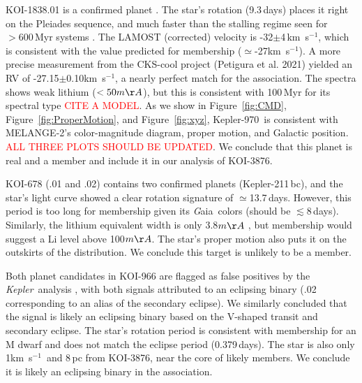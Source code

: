 \documentclass[twocolumn]{aastex631}
\newcommand{\starname}{KOI-3876}
\newcommand{\starnametwo}{Kepler-970}
\newcommand{\kepler}{{\it Kepler}}
\newcommand\kms{km~s$^{-1}$}
\newcommand{\gaia}{{\textit Gaia}}
\newcommand{\association}{MELANGE-2}
\begin{document}
KOI-1838.01 is a confirmed planet \citep[Kepler-970 b;][]{2016ApJ...822...86M}. The star's rotation (9.3\,days) places it right on the Pleiades sequence, and much faster than the stalling regime seen for $>600$\,Myr systems \citep{Curtis_stall}. The LAMOST (corrected) velocity is -32$\pm$4\,\kms, which is consistent with the value predicted for membership ($\simeq$-27\kms). A more precise measurement from the CKS-cool project (Petigura et al. 2021) yielded an RV of -27.15$\pm$0.10\kms, a nearly perfect match for the association. The spectra shows weak lithium ($<50m\AA$), but this is consistent with 100\,Myr for its spectral type \textcolor{red}{CITE A MODEL}. As we show in Figure~\ref{fig:CMD}, Figure~\ref{fig:ProperMotion}, and Figure~\ref{fig:xyz}, \starnametwo\ is consistent with \association's color-magnitude diagram, proper motion, and Galactic position. \textcolor{red}{ALL THREE PLOTS SHOULD BE UPDATED}. We conclude that this planet is real and a member and include it in our analysis of \starname.


KOI-678 (.01 and .02) contains two confirmed planets (Kepler-211\,bc), and the star's light curve showed a clear rotation signature of $\simeq$13.7\,days. However, this period is too long for membership given its \gaia\ colors (should be $\lesssim$8\,days). Similarly, the lithium equivalent width is only 3.8$m\AA$ \citep{2018ApJ...855..115B}, but membership would suggest a Li level above 100$m\AA$. The star's proper motion also puts it on the outskirts of the distribution. We conclude this target is unlikely to be a member. 

Both planet candidates in KOI-966 are flagged as false positives by the \kepler\ analysis \citep{2016ApJS..224...12C}, with both signals attributed to an eclipsing binary (.02 corresponding to an alias of the secondary eclipse). We similarly concluded that the signal is likely an eclipsing binary based on the V-shaped transit and secondary eclipse. The star's rotation period \citep[3.92\,days;][]{2013MNRAS.436.1883W} is consistent with membership for an M dwarf and does not match the eclipse period (0.379\,days). The star is also only 1\kms\ and 8\,pc from \starname, near the core of likely members. We conclude it is likely an eclipsing binary in the association.
\end{document}
